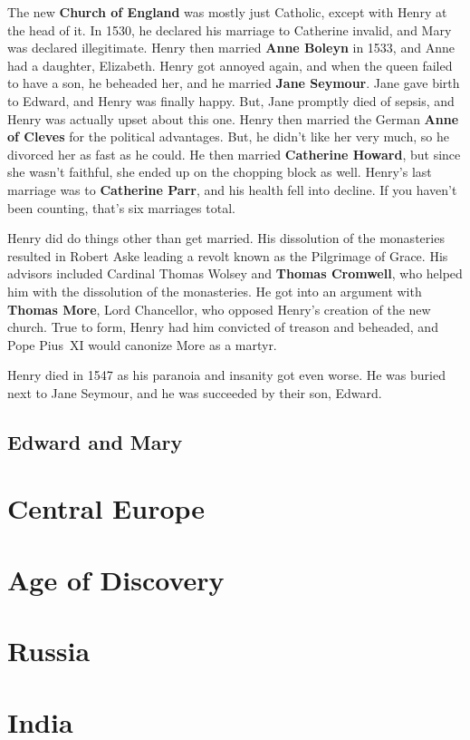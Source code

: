 The new \textbf{Church of England} was mostly just Catholic, except with Henry at the head of it.
In 1530, he declared his marriage to Catherine invalid, and Mary was declared illegitimate.
Henry then married \textbf{Anne Boleyn} in 1533, and Anne had a daughter, Elizabeth.
Henry got annoyed again, and when the queen failed to have a son, he beheaded her, and he married \textbf{Jane Seymour}.
Jane gave birth to Edward, and Henry was finally happy.
But, Jane promptly died of sepsis, and Henry was actually upset about this one.
Henry then married the German \textbf{Anne of Cleves} for the political advantages.
But, he didn't like her very much, so he divorced her as fast as he could.
He then married \textbf{Catherine Howard}, but since she wasn't faithful,
she ended up on the chopping block as well.
Henry's last marriage was to \textbf{Catherine Parr}, and his health fell into decline.
If you haven't been counting, that's six marriages total.

Henry did do things other than get married.
His dissolution of the monasteries resulted in Robert Aske leading a revolt known as the Pilgrimage of Grace.
His advisors included Cardinal Thomas Wolsey and \textbf{Thomas Cromwell},
who helped him with the dissolution of the monasteries.
He got into an argument with \textbf{Thomas More}, Lord Chancellor, who opposed Henry's creation of the new church.
True to form, Henry had him convicted of treason and beheaded, and Pope Pius~XI would canonize More as a martyr.

Henry died in 1547 as his paranoia and insanity got even worse.
He was buried next to Jane Seymour, and he was succeeded by their son, Edward.

\subsection*{Edward and Mary}

\section{Central Europe}

\section{Age of Discovery}

\section{Russia}

\section{India}

